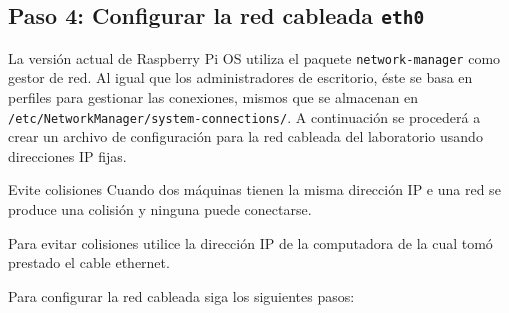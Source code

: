 \documentclass[letterpaper,10.5pt]{article}
\begin{document}
%
%
\subsection{Paso 4: Configurar la red cableada \texttt{eth0}}%
\label{sec:network-setup}
La versión actual de Raspberry Pi OS utiliza el paquete \texttt{network-manager} como gestor de red.
Al igual que los administradores de escritorio, éste se basa en perfiles para gestionar las conexiones, mismos que se almacenan en \texttt{/etc/NetworkManager/system-connections/}.
A continuación se procederá a crear un archivo de configuración para la red cableada del laboratorio usando direcciones IP fijas.

\begin{greenbox}{Evite colisiones}
	Cuando dos máquinas tienen la misma dirección IP e una red se produce una colisión y ninguna puede conectarse.

	Para evitar colisiones utilice la dirección IP de la computadora de la cual tomó prestado el cable ethernet.
\end{greenbox}

Para configurar la red cableada siga los siguientes pasos:
\end{document}
